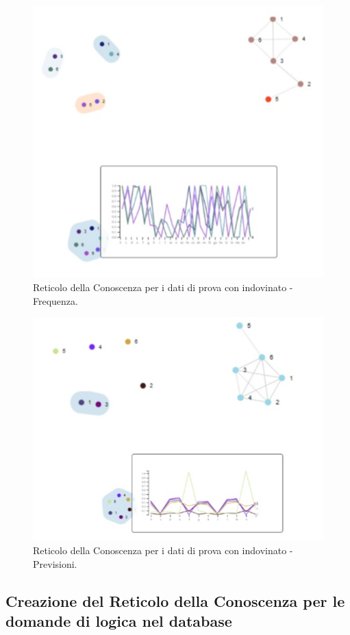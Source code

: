 \begin{figure}[H]
\centering
	\includegraphics[width=0.60\linewidth]{./image/collage_reticolo-probability-FREQ.png}
	\caption{Reticolo della Conoscenza per i dati di prova con indovinato - Frequenza.}
	\label{Reticolo della Conoscenza per i dati di prova con indovinato - Frequenza.}
\end{figure}
\noindent
\begin{figure}[H]
\centering
	\includegraphics[width=0.60\linewidth]{./image/collage_reticolo-probability.png}
	\caption{Reticolo della Conoscenza per i dati di prova con indovinato - Previsioni.}
	\label{Reticolo della Conoscenza per i dati di prova con indovinato - Previsioni.}
\end{figure}
\noindent


\subsection{Creazione del Reticolo della Conoscenza per le domande di logica nel database}
\label{Creazione del Reticolo della Conoscenza per le domande di logica nel database}

